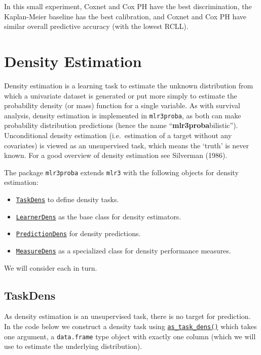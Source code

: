 In this small experiment, Coxnet and Cox PH have the best
discrimination, the Kaplan-Meier baseline has the best calibration, and
Coxnet and Cox PH have similar overall predictive accuracy (with the
lowest RCLL).

\hypertarget{sec-density}{%
\section{Density Estimation}\label{sec-density}}

Density estimation is a learning task to
estimate the unknown distribution from which a univariate dataset is
generated or put more simply to estimate the probability density (or
mass) function for a single variable. As with survival analysis, density
estimation is implemented in \texttt{mlr3proba}, as both can make
probability distribution predictions (hence the name
``\textbf{mlr3proba}bilistic''). Unconditional density estimation
(i.e.~estimation of a target without any covariates) is viewed as an
unsupervised task, which means the `truth' is never known. For a good
overview of density estimation see Silverman (1986).

The package \texttt{mlr3proba} extends \texttt{mlr3} with the following
objects for density estimation:

\begin{itemize}
\tightlist
\item
  \href{https://mlr3proba.mlr-org.com/reference/TaskDens.html}{\texttt{TaskDens}}
  to define density tasks.
\item
  \href{https://mlr3proba.mlr-org.com/reference/LearnerDens.html}{\texttt{LearnerDens}}
  as the base class for density estimators.
\item
  \href{https://mlr3proba.mlr-org.com/reference/PredictionDens.html}{\texttt{PredictionDens}}
  for density predictions.
\item
  \href{https://mlr3proba.mlr-org.com/reference/MeasureDens.html}{\texttt{MeasureDens}}
  as a specialized class for density performance measures.
\end{itemize}

We will consider each in turn.

\hypertarget{taskdens}{%
\subsection{TaskDens}\label{taskdens}}

As density estimation is an unsupervised task, there is no target for
prediction. In the code below we construct a density task using
\href{https://mlr3proba.mlr-org.com/reference/as_task_dens.html}{\texttt{as\_task\_dens()}}
which takes one argument, a \texttt{data.frame} type object with exactly
one column (which we will use to estimate the underlying distribution).

